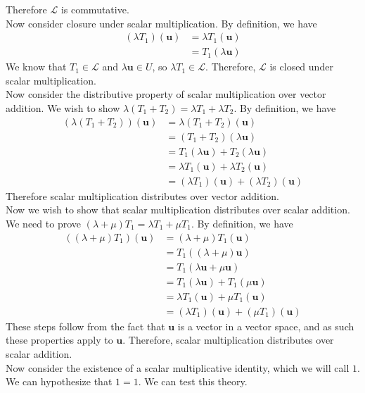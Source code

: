 \documentclass[12pt, letterpaper]{article}
\begin{document}
\begin{solution}
\[    \]
    Therefore \(\mathcal{L} \) is commutative.\\
    Now consider closure under scalar multiplication. By definition, we have 
    \begin{align*}
        (\lambda T_1)(\mathbf{u})&=\lambda T_1(\mathbf{u})\\
        &=T_1(\lambda \mathbf{u})
    \end{align*}
    We know that \(T_1\in\mathcal{L} \) and \(\lambda \mathbf{u}\in U\), so \(\lambda T_1\in \mathcal{L} \). Therefore, \(\mathcal{L} \) is closed under scalar multiplication.\\
    Now consider the distributive property of scalar multiplication over vector addition. We wish to show \(\lambda (T_1 +T_2)=\lambda T_1 +\lambda T_2\). By definition, we have
    \begin{align*}
        (\lambda (T_1 +T_2))(\mathbf{u})&=\lambda (T_1 +T_2)(\mathbf{u})\\
        &=(T_1 +T_2)(\lambda \mathbf{u})\\
        &=T_1(\lambda \mathbf{u})+T_2(\lambda \mathbf{u})\\
        &=\lambda T_1(\mathbf{u})+\lambda T_2(\mathbf{u})\\
        &=(\lambda T_1)(\mathbf{u})+(\lambda T_2)(\mathbf{u})
    \end{align*}
    Therefore scalar multiplication distributes over vector addition.\\
    Now we wish to show that scalar multiplication distributes over scalar addition. We need to prove \((\lambda +\mu )T_1 = \lambda T_1 +\mu T_1\). By definition, we have
    \begin{align*}
        ((\lambda +\mu )T_1)(\mathbf{u})&=(\lambda +\mu )T_1(\mathbf{u})\\
        &=T_1((\lambda +\mu )\mathbf{u})\\
        &=T_1(\lambda \mathbf{u}+\mu \mathbf{u})\\
        &=T_1(\lambda \mathbf{u})+T_1(\mu \mathbf{u})\\
        &=\lambda T_1(\mathbf{u})+\mu T_1(\mathbf{u})\\
        &=(\lambda T_1)(\mathbf{u})+(\mu T_1)(\mathbf{u})
    \end{align*}
    These steps follow from the fact that \(\mathbf{u}\) is a vector in a vector space, and as such these properties apply to \(\mathbf{u}\). Therefore, scalar multiplication distributes over scalar addition.\\
    Now consider the existence of a scalar multiplicative identity, which we will call \(1\). We can hypothesize that \(1=1\). We can test this theory.

\end{solution}
\end{document}
